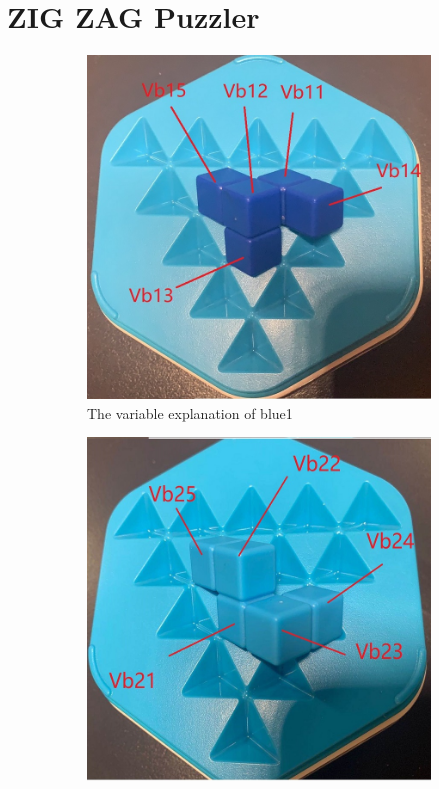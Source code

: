 \section{ZIG ZAG Puzzler}
\label{section:3Dgame}
\begin{figure}[htbp]
\centering
\begin{subfigure}[b]{0.25\textwidth}
\centering
\includegraphics[width=\textwidth]{figs/3Dblue1.jpg}
\caption{The variable explanation of blue1}
  \label{fig:3Dblue1}
\end{subfigure}
\begin{subfigure}[b]{0.25\textwidth}
\centering
\includegraphics[width=\textwidth]{figs/3Dblue2.jpg}

\end{subfigure}
\end{figure}
